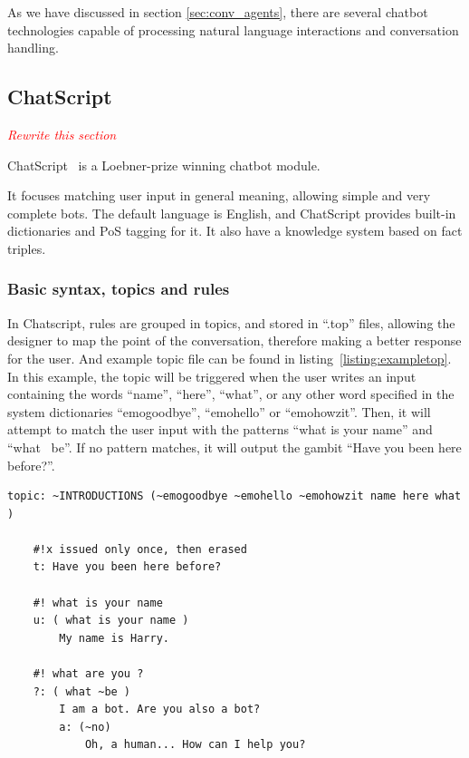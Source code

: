 As we have discussed in section \ref{sec:conv_agents}, there are several chatbot technologies capable of processing natural language interactions and conversation handling.

\subsection{ChatScript}
\label{subsec:chatscript}

\emph{\textcolor{red}{Rewrite this section}}

ChatScript~\cite{wilcox2013} is a Loebner-prize winning chatbot module.

It focuses matching user input in general meaning, allowing simple and very complete bots. The default language is English, and ChatScript provides built-in dictionaries and \ac{PoS} tagging for it. It also have a knowledge system based on fact triples.

\subsubsection{Basic syntax, topics and rules}

In Chatscript, rules are grouped in topics, and stored in ``.top'' files, allowing the designer to map the point of the conversation, therefore making a better response for the user. And example topic file can be found in listing~\ref{listing:exampletop}. In this example, the topic will be triggered when the user writes an input containing the words ``name'', ``here'', ``what'', or any other word specified in the system dictionaries ``emogoodbye'', ``emohello'' or ``emohowzit''. Then, it will attempt to match the user input with the patterns ``what is your name'' and ``what ~be''. If no pattern matches, it will output the gambit ``Have you been here before?''.

\begin{center} 
  \begin{lstlisting}[language={}, captionpos=b, caption=Example topic file, label=listing:exampletop]   
    topic: ~INTRODUCTIONS (~emogoodbye ~emohello ~emohowzit name here what )
    
    #!x issued only once, then erased
    t: Have you been here before?
    
    #! what is your name 
    u: ( what is your name ) 
        My name is Harry.
        
    #! what are you ?
    ?: ( what ~be )
        I am a bot. Are you also a bot?
        a: (~no)
            Oh, a human... How can I help you?
  \end{lstlisting}
\end{center}

